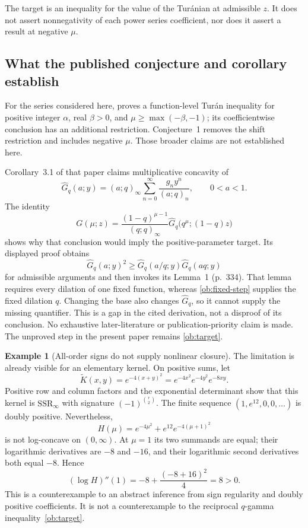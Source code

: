 \documentclass[11pt,a4paper]{article}
\theoremstyle{definition}
\newtheorem{example}[theorem]{Example}
\theoremstyle{remark}
\newcommand{\SSR}{\mathrm{SSR}}
\begin{document}
The target is an inequality for the value of the Tur\'anian at
admissible \(z\). It does not assert nonnegativity of each power
series coefficient, nor does it assert a result at negative \(\mu\).

\subsection{What the published conjecture and corollary establish}
\label{ob:published-status}

For the series considered here, \cite[Theorem~3]{KK2018} proves a
function-level Tur\'an inequality for positive integer \(\alpha\),
real \(\beta>0\), and \(\mu\ge\max(-\beta,-1)\); its coefficientwise
conclusion has an additional restriction. Conjecture~1 removes the
shift restriction and includes negative \(\mu\). Those broader
claims are not established here.

Corollary~3.1 of that paper claims multiplicative concavity of
\begin{equation}\label{ob:ghat}
 \widehat G_q(a;y)=(a;q)_\infty
 \sum_{n=0}^{\infty}\frac{g_ny^n}{(a;q)_n},\qquad 0<a<1.
\end{equation}
The identity
\begin{equation}\label{ob:ghat-relation}
 G(\mu;z)=\frac{(1-q)^{\mu-1}}{(q;q)_\infty}
 \widehat G_q\bigl(q^\mu;(1-q)z\bigr)
\end{equation}
shows why that conclusion would imply the positive-parameter target.
Its displayed proof obtains
\begin{equation}\label{ob:fixed-step}
 \widehat G_q(a;y)^2\ge
 \widehat G_q(a/q;y)\widehat G_q(aq;y)
\end{equation}
for admissible arguments and then invokes its Lemma~1 (p.~334).
That lemma requires every dilation of one fixed function, whereas
\eqref{ob:fixed-step} supplies the fixed dilation \(q\).
Changing the base also changes \(\widehat G_q\), so it cannot
supply the missing quantifier. This is a gap in the cited derivation,
not a disproof of its conclusion. No exhaustive later-literature or
publication-priority claim is made. The unproved step in the present
paper remains \eqref{ob:target}.

\begin{example}[All-order signs do not supply nonlinear closure]
\label{ob:gaussian}
The limitation is already visible for an elementary kernel. On
positive sums, let
\[
 \widetilde K(x,y)=e^{-4(x+y)^2}
 =e^{-4x^2}e^{-4y^2}e^{-8xy}.
\]
Positive row and column factors and the exponential determinant show
that this kernel is \(\SSR_\infty\) with signature
\((-1)^{\binom r2}\). The finite sequence
\((1,e^{12},0,0,\ldots)\) is doubly positive. Nevertheless,
\[
 H(\mu)=e^{-4\mu^2}+e^{12}e^{-4(\mu+1)^2}
\]
is not log-concave on \((0,\infty)\). At \(\mu=1\) its two
summands are equal; their logarithmic derivatives are \(-8\) and
\(-16\), and their logarithmic second derivatives both equal
\(-8\). Hence
\[
 (\log H)''(1)=-8+\frac{(-8+16)^2}{4}=8>0.
\]
This is a counterexample to an abstract inference from sign regularity
and doubly positive coefficients. It is not a counterexample to the
reciprocal \(q\)-gamma inequality~\eqref{ob:target}.
\end{example}
\end{document}
